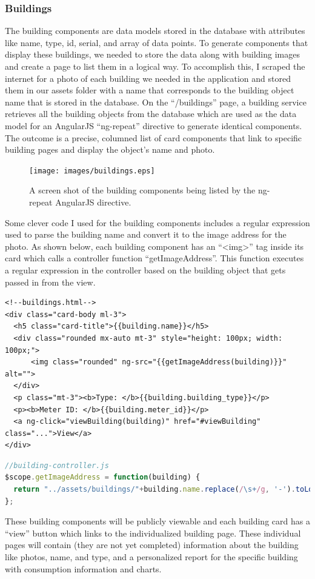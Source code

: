 \documentclass[letterpaper,10pt,serif,draftclsnofoot,onecolumn,compsoc,titlepage]{IEEEtran}
\begin{document}
\subsubsection{Buildings}
The building components are data models stored in the database with attributes like name, type, id, serial, and array of data points. To generate components that display these buildings, we needed to store the data along with building images and create a page to list them in a logical way. To accomplish this, I scraped the internet for a photo of each building we needed in the application and stored them in our assets folder with a name that corresponds to the building object name that is stored in the database. On the ``/buildings'' page, a building service retrieves all the building objects from the database which are used as the data model for an AngularJS ``ng-repeat'' directive to generate identical components. The outcome is a precise, columned list of card components that link to specific building pages and display the object's name and photo. 
\begin{figure}[H]
  \centering
  \texttt{[image: images/buildings.eps]}
  \caption{A screen shot of the building components being listed by the ng-repeat AngularJS directive.}
\end{figure}
Some clever code I used for the building components includes a regular expression used to parse the building name and convert it to the image address for the photo. As shown below, each building component has an ``\textless img\textgreater'' tag inside its card which calls a controller function ``getImageAddress''. This function executes a regular expression in the controller based on the building object that gets passed in from the view.
\begin{lstlisting}[language=HTML5]
<!--buildings.html-->
<div class="card-body ml-3">
  <h5 class="card-title">{{building.name}}</h5>
  <div class="rounded mx-auto mt-3" style="height: 100px; width: 100px;">
      <img class="rounded" ng-src="{{getImageAddress(building)}}" alt="">
  </div>
  <p class="mt-3"><b>Type: </b>{{building.building_type}}</p>
  <p><b>Meter ID: </b>{{building.meter_id}}</p>
  <a ng-click="viewBuilding(building)" href="#viewBuilding" class="...">View</a>
</div>
\end{lstlisting}
\begin{lstlisting}[language=JavaScript]
//building-controller.js
$scope.getImageAddress = function(building) {
  return "../assets/buildings/"+building.name.replace(/\s+/g, '-').toLowerCase()+".jpg";
};
\end{lstlisting}
These building components will be publicly viewable and each building card has a ``view'' button which links to the individualized building page. These individual pages will contain (they are not yet completed) information about the building like photos, name, and type, and a personalized report for the specific building with consumption information and charts.
\end{document}
